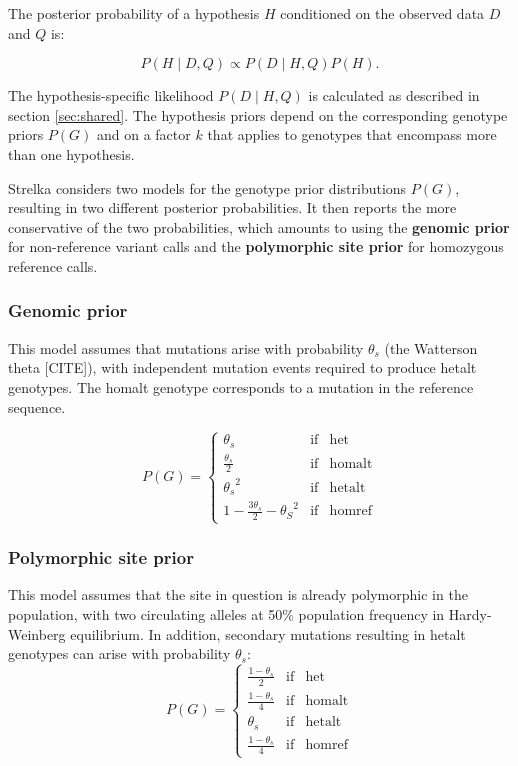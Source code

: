 \documentclass{article}
\begin{document}
The posterior probability of a hypothesis $H$ conditioned on the observed data $D$ and $Q$ is:

\begin{equation*}
\label{eq:posterior}
P(H \mid D,Q) \propto P(D \mid H,Q)P(H).
\end{equation*}

The hypothesis-specific likelihood $P(D \mid H,Q)$ is calculated as described in section \ref{sec:shared}. The hypothesis priors depend on the corresponding genotype priors $P(G)$ and on a factor $k$ that applies to genotypes that encompass more than one hypothesis.

Strelka considers two models for the genotype prior distributions $P(G)$, resulting in two different posterior probabilities. It then reports the more conservative of the two probabilities, which amounts to using the {\bf genomic prior} for non-reference variant calls and the {\bf polymorphic site prior} for homozygous reference calls.

\subsubsection{Genomic prior}
\label{sec:germline_genomic_prior}
This model assumes that mutations arise with probability $\theta_s$ (the Watterson theta [CITE]), with independent mutation events required to produce hetalt genotypes. The homalt genotype corresponds to a mutation in the reference sequence.

\begin{equation*}
P(G) = \left\{
\begin{array}{lcl}
\theta_s & \mathrm{if} & \mathrm{het}\\
\frac{\theta_s}{2} & \mathrm{if} & \mathrm{homalt}\\
{\theta_s}^2 & \mathrm{if} & \mathrm{hetalt}\\
1-\frac{3\theta_s}{2}-{\theta_S}^2 & \mathrm{if} & \mathrm{homref}
\end{array} \right.
\end{equation*}

\subsubsection{Polymorphic site prior}
This model assumes that the site in question is already polymorphic in the population, with two circulating alleles at 50\% population frequency in Hardy-Weinberg equilibrium. In addition, secondary mutations resulting in hetalt genotypes can arise with probability $\theta_s$:
\begin{equation*}
P(G) = \left\{
\begin{array}{lcl}
\frac{1-\theta_s}{2} & \mathrm{if} & \mathrm{het}\\
\frac{1-\theta_s}{4} & \mathrm{if} & \mathrm{homalt}\\
\theta_s & \mathrm{if} & \mathrm{hetalt}\\
\frac{1-\theta_s}{4} & \mathrm{if} & \mathrm{homref}
\end{array} \right.
\end{equation*}
\end{document}

